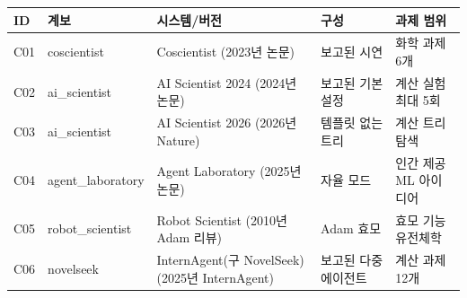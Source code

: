 \begin{tabular}{lp{.13\linewidth}p{.24\linewidth}p{.22\linewidth}p{.23\linewidth}}
\toprule
ID & 계보 & 시스템/버전 & 구성 & 과제 범위 \\
\midrule
C01 & coscientist & Coscientist (2023년 논문) & 보고된 시연 & 화학 과제 6개 \\
C02 & ai\_scientist & AI Scientist 2024 (2024년 논문) & 보고된 기본 설정 & 계산 실험 최대 5회 \\
C03 & ai\_scientist & AI Scientist 2026 (2026년 Nature) & 템플릿 없는 트리 & 계산 트리 탐색 \\
C04 & agent\_laboratory & Agent Laboratory (2025년 논문) & 자율 모드 & 인간 제공 ML 아이디어 \\
C05 & robot\_scientist & Robot Scientist (2010년 Adam 리뷰) & Adam 효모 & 효모 기능유전체학 \\
C06 & novelseek & InternAgent(구 NovelSeek) (2025년 InternAgent) & 보고된 다중 에이전트 & 계산 과제 12개 \\
\bottomrule
\end{tabular}
